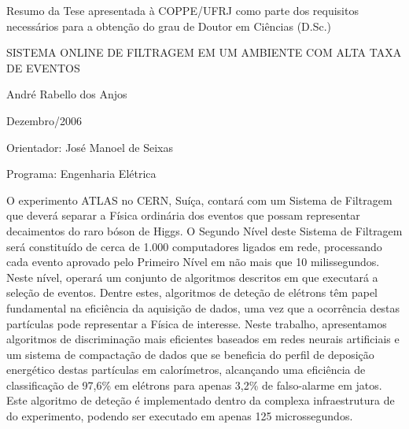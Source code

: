 \newenvironment{summary}[1]{%
\begin{minipage}{\textwidth}%
\newcommand{\saveparameter}{\baselinestretch}%
\renewcommand{\baselinestretch}{#1}%
\normalsize}%
{%
\renewcommand{\baselinestretch}{\saveparameter}%
\end{minipage}%
}


\noindent
Resumo da Tese apresentada à COPPE/UFRJ como parte dos requisitos necessários
para a obtenção do grau de Doutor em Ciências (D.Sc.)

\vspace{1.5cm}

\begin{center}
SISTEMA ONLINE DE FILTRAGEM EM UM AMBIENTE COM ALTA TAXA DE EVENTOS
\vspace{1cm}

André Rabello dos Anjos
\vspace{1cm}

Dezembro/2006
\end{center}
\vspace{1.5cm}

\noindent
Orientador: José Manoel de Seixas
\vspace{1.5cm}

\noindent
Programa: Engenharia Elétrica
\vspace{2cm}

\noindent \begin{summary}{1.2}
\hspace{0.8cm}O experimento ATLAS no CERN, Suíça, contará com um Sistema de
Filtragem que deverá separar a Física ordinária dos eventos que possam
representar decaimentos do raro bóson de Higgs. O Segundo Nível deste Sistema
de Filtragem será constituído de cerca de 1.000 computadores ligados em rede,
processando cada evento aprovado pelo Primeiro Nível em não mais que 10
milissegundos. Neste nível, operará um conjunto de algoritmos descritos em
 que executará a seleção de eventos. Dentre estes, algoritmos de
deteção de elétrons têm papel fundamental na eficiência da aquisição de dados,
uma vez que a ocorrência destas partículas pode representar a Física de
interesse. Neste trabalho, apresentamos algoritmos de discriminação mais
eficientes baseados em redes neurais artificiais e um sistema de compactação
de dados que se beneficia do perfil de deposição energético destas partículas
em calorímetros, alcançando uma eficiência de classificação de 97,6\% em
elétrons para apenas 3,2\% de falso-alarme em jatos. Este algoritmo de deteção
é implementado dentro da complexa infraestrutura de  do
experimento, podendo ser executado em apenas 125 microssegundos.
\end{summary}

